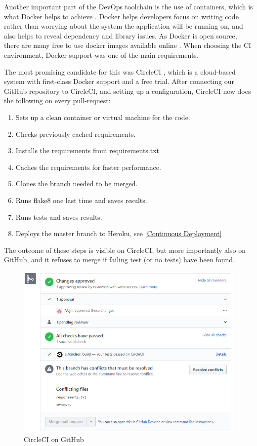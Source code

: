 \documentclass[main.tex]{subfiles}
\begin{document}
Another important part of the DevOps toolchain is the use of containers, which is what Docker helps to achieve \cite{Docker}. Docker helps developers focus on writing code rather than worrying about the system the application will be running on, and also helps to reveal dependency and library issues. As Docker is open source, there are many free to use docker images available online \cite{Docker Images}. When choosing the CI environment, Docker support was one of the main requirements. 

The most promising candidate for this was CircleCI \cite{CircleCI}, which is a cloud-based system with first-class Docker support and a free trial. After connecting our GitHub repository to CircleCI, and setting up a configuration, CircleCI now does the following on every pull-request:

\begin{enumerate}
    \item Sets up a clean container or virtual machine for the code.
    \item Checks previously cached requirements. 
    \item Installs the requirements from requirements.txt
    \item Caches the requirements for faster performance.
    \item Clones the branch needed to be merged.
    \item Runs flake8 one last time and saves results.
    \item Runs tests and saves results. 
    \item Deploys the master branch to Heroku, see \ref{Continuous Deployment}
\end{enumerate}

The outcome of these steps is visible on CircleCI, but more importantly also on GitHub, and it refuses to merge if failing test (or no tests) have been found. 

 \begin{figure}[H]
   \centering
   \includegraphics[scale=0.6]{05Coding/05Pictures/circleCI.png}
   \caption{CircleCI on GitHub}
   \label{CircleCI}
\end{figure}
\end{document}
